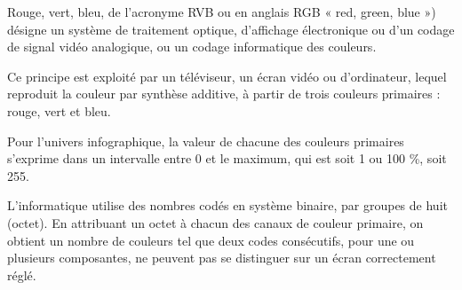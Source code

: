 \documentclass[
  letterpaper,
]{scrbook}
\theoremstyle{plain}
\theoremstyle{definition}
\theoremstyle{definition}
\theoremstyle{remark}
\begin{document}
Rouge, vert, bleu, de l'acronyme RVB ou en anglais RGB « red, green,
blue ») désigne un système de traitement optique, d'affichage
électronique ou d'un codage de signal vidéo analogique, ou un codage
informatique des couleurs.

Ce principe est exploité par un téléviseur, un écran vidéo ou
d'ordinateur, lequel reproduit la couleur par synthèse additive, à
partir de trois couleurs primaires : rouge, vert et bleu.

Pour l'univers infographique, la valeur de chacune des couleurs
primaires s'exprime dans un intervalle entre 0 et le maximum, qui est
soit 1 ou 100 \%, soit 255.

L'informatique utilise des nombres codés en système binaire, par groupes
de huit (octet). En attribuant un octet à chacun des canaux de couleur
primaire, on obtient un nombre de couleurs tel que deux codes
consécutifs, pour une ou plusieurs composantes, ne peuvent pas se
distinguer sur un écran correctement réglé.
\end{document}

